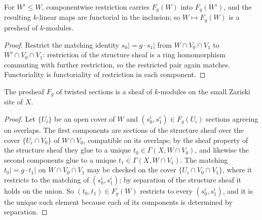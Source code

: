 \begin{lemma}
  \label{lem:twistSections_presheaf}
  \leanok
  For \(W' \le W\), componentwise restriction carries \(F_g(W)\) into \(F_g(W')\), and
  the resulting \(k\)-linear maps are functorial in the inclusion; so \(W \mapsto F_g(W)\)
  is a presheaf of \(k\)-modules.
\end{lemma}
\begin{proof}
  \leanok
  Restrict the matching identity \(s_0| = g \cdot s_1|\) from \(W \cap V_0 \cap V_1\) to
  \(W' \cap V_0 \cap V_1\): restriction of the structure sheaf is a ring homomorphism
  commuting with further restriction, so the restricted pair again matches.
  Functoriality is functoriality of restriction in each component.
\end{proof}

\begin{theorem}
  \label{thm:twistSheaf}
  \leanok
  The presheaf \(F_g\) of twisted sections is a sheaf of \(k\)-modules on the small
  Zariski site of \(X\).
\end{theorem}
\begin{proof}
  \leanok
  Let \(\{U_i\}\) be an open cover of \(W\) and \((s_0^i, s_1^i) \in F_g(U_i)\) sections
  agreeing on overlaps. The first components are sections of the structure sheaf over the
  cover \(\{U_i \cap V_0\}\) of \(W \cap V_0\), compatible on its overlaps; by the sheaf
  property of the structure sheaf they glue to a unique \(t_0 \in \Gamma(X, W \cap V_0)\),
  and likewise the second components glue to a unique \(t_1 \in \Gamma(X, W \cap V_1)\).
  The matching \(t_0| = g \cdot t_1|\) on \(W \cap V_0 \cap V_1\) may be checked on the
  cover \(\{U_i \cap V_0 \cap V_1\}\), where it restricts to the matching of
  \((s_0^i, s_1^i)\); by separation of the structure sheaf it holds on the union. So
  \((t_0, t_1) \in F_g(W)\) restricts to every \((s_0^i, s_1^i)\), and it is the unique
  such element because each of its components is determined by separation.
\end{proof}

